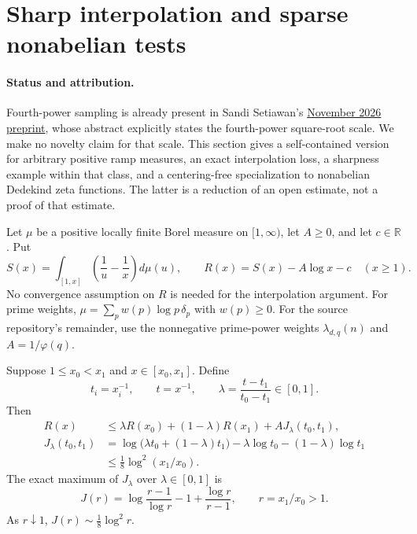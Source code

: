 \section{Sharp interpolation and sparse nonabelian tests}\label{sec:sparse-sampling}

\paragraph{Status and attribution.}
Fourth-power sampling is already present in Sandi Setiawan's
\href{https://www.preprints.org/manuscript/202611.0738}{November 2026 preprint},
whose abstract explicitly states the fourth-power square-root scale.
We make no novelty claim for that scale. This section gives a self-contained
version for arbitrary positive ramp measures, an exact interpolation loss,
a sharpness example within that class, and a centering-free specialization
to nonabelian Dedekind zeta functions. The latter is a reduction of an open
estimate, not a proof of that estimate.

Let $\mu$ be a positive locally finite Borel measure on $[1,\infty)$,
let $A\ge0$, and let $c\in\mathbb R$. Put
\[
 S(x)=\int_{[1,x]}\left(\frac1u-\frac1x\right)d\mu(u),
 \qquad R(x)=S(x)-A\log x-c\quad(x\ge1).
\]
No convergence assumption on $R$ is needed for the interpolation argument.
For prime weights, $\mu=\sum_p w(p)\log p\,\delta_p$ with $w(p)\ge0$.
For the source repository's remainder, use the nonnegative prime-power
weights $\lambda_{d,q}(n)$ and $A=1/\varphi(q)$.

\begin{lemma}\label{lem:sampling-jensen}
Suppose $1\le x_0<x_1$ and $x\in[x_0,x_1]$. Define
\[
 t_i=x_i^{-1},\qquad t=x^{-1},\qquad
 \lambda=\frac{t-t_1}{t_0-t_1}\in[0,1].
\]
Then
\begin{align}
 R(x)&\le\lambda R(x_0)+(1-\lambda)R(x_1)+A J_\lambda(t_0,t_1),
 \label{eq:sampling-interpolation}\\
 J_\lambda(t_0,t_1)
 &=\log\bigl(\lambda t_0+(1-\lambda)t_1\bigr)
       -\lambda\log t_0-(1-\lambda)\log t_1\nonumber\\
 &\le\frac18\log^2(x_1/x_0).
 \label{eq:sampling-loggap}
\end{align}
The exact maximum of $J_\lambda$ over $\lambda\in[0,1]$ is
\[
 J(r)=\log\frac{r-1}{\log r}-1+\frac{\log r}{r-1},
 \qquad r=x_1/x_0>1.
\]
As $r\downarrow1$, $J(r)\sim\frac18\log^2r$.
\end{lemma}

